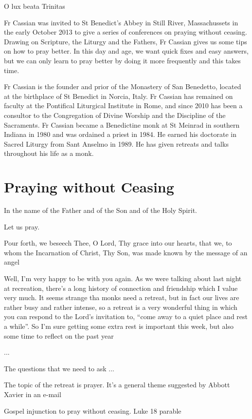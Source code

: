 \documentclass[10pt,a5paper]{book}
\begin{document}
O lux beata Trinitas

Fr Cassian was invited to St Benedict's Abbey in Still River, Massachussets in the early October 2013 to give a series of conferences on praying without ceasing. Drawing on Scripture, the Liturgy and the Fathers, Fr Cassian gives us some tips on how to pray better. In this day and age, we want quick fixes and easy answers, but we can only learn to pray better by doing it more frequently and this takes time.

Fr Cassian is the founder and prior of the Monastery of San Benedetto, located at the birthplace of St Benedict in Norcia, Italy. Fr Cassian has remained on faculty at the Pontifical Liturgical Institute in Rome, and since 2010 has been a consultor to the Congregation of Divine Worship and the Discipline of the Sacraments. Fr Cassian became a Benedictine monk at St Meinrad in southern Indiana in 1980 and was ordained a priest in 1984. He earned his doctorate in Sacred Liturgy from Sant Anselmo in 1989. He has given retreats and talks throughout his life as a monk.

\chapter{Praying without Ceasing}

In the name of the Father and of the Son and of the Holy Spirit.

Let us pray.

Pour forth, we beseech Thee, O Lord, Thy grace into our hearts, that we, to whom the Incarnation of Christ, Thy Son, was made known by the message of an angel

Well, I'm very happy to be with you again. As we were talking about last night at recreation, there's a long history of connection and friendship which I value very much. It seems strange tha monks need a retreat, but in fact our lives are rather busy and rather intense, so a retreat is a very wonderful thing in which you can respond to the Lord's invitation to, ``come away to a quiet place and rest a while''. So I'm sure getting some extra rest is important this week, but also some time to reflect on the past year

...

The questions that we need to ask ...


The topic of the retreat is prayer. It's a general theme suggested by Abbott Xavier in an e-mail

Gospel injunction to pray without ceasing. Luke 18 parable
\end{document}
